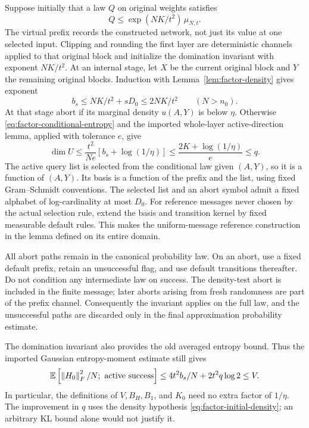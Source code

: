 Suppose initially that a law $Q$ on original weights satisfies
\begin{equation}\label{eq:factor-initial-density}
 Q\le\exp(NK/t^2)\,\mu_{N,t}.
\end{equation}
The virtual prefix records the constructed network, not just its value at
one selected input. Clipping and rounding the first layer are deterministic
channels applied to that original block and initialize the domination
invariant with exponent $NK/t^2$. At an internal stage, let $X$ be the
current original block and $Y$ the remaining original blocks. Induction
with Lemma~\ref{lem:factor-density} gives exponent
\[
 b_s\le NK/t^2+sD_0\le2NK/t^2\qquad(N>n_0).
\]
At that stage abort if its marginal density $u(A,Y)$ is below $\eta$.
Otherwise \eqref{eq:factor-conditional-entropy} and the imported
whole-layer active-direction lemma, applied with tolerance $e$, give
\[
 \dim U\le\frac{t^2}{Ne}
             [b_s+\log(1/\eta)]
       \le\frac{2K+\log(1/\eta)}e\le q.
\]
The active query list is selected from the conditional law given $(A,Y)$,
so it is a function of $(A,Y)$. Its basis is a function of the prefix and
the list, using fixed Gram--Schmidt conventions. The selected list and an
abort symbol admit a fixed alphabet of log-cardinality at most $D_0$.
For reference messages never chosen by the actual selection rule, extend
the basis and transition kernel by fixed measurable default rules. This
makes the uniform-message reference construction in the lemma defined
on its entire domain.

All abort paths remain in the canonical probability law. On an abort,
use a fixed default prefix, retain an unsuccessful flag, and use default
transitions thereafter. Do not condition any intermediate law on success.
The density-test abort is included in the finite message; later aborts
arising from fresh randomness are part of the prefix channel. Consequently
the invariant applies on the full law, and the unsuccessful paths are
discarded only in the final approximation probability estimate.

The domination invariant also provides the old averaged entropy bound.
Thus the imported Gaussian entropy-moment estimate still gives
\begin{equation}\label{eq:factor-active-moment}
 \mathbb E\left[\left\|H_0\right\|_F^2/N;\ \text{active success}\right]
       \le4t^2b_s/N+2t^2q\log2\le V.
\end{equation}
In particular, the definitions of $V,B_H,B_1$, and $K_0$ need no extra
factor of $1/\eta$. The improvement in $q$ uses the density hypothesis
\eqref{eq:factor-initial-density}; an arbitrary KL bound alone would not
justify it.

